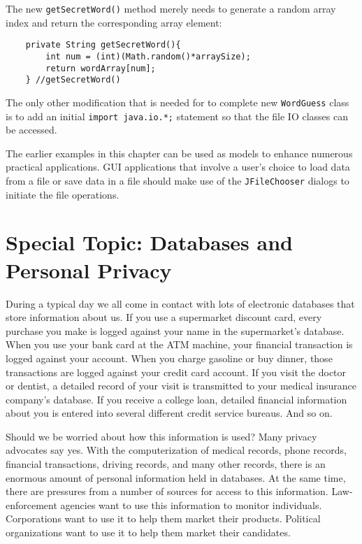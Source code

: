 The new {\tt getSecretWord()} method merely needs to generate a
random array index and return the corresponding array element:
\begin{jjjlisting}
\begin{lstlisting}
    private String getSecretWord(){
        int num = (int)(Math.random()*arraySize);
        return wordArray[num];
    } //getSecretWord()
\end{lstlisting}
\end{jjjlisting}

\noindent The only other modification that is needed for to complete new
{\tt WordGuess} class is to add an initial {\tt import java.io.*;} statement
so that the file IO classes can be accessed. 

The earlier examples in this chapter can be used as models
to enhance numerous practical applications.  GUI applications that involve
a user's choice to load data from a file or save data in a file should make 
use of the {\tt JFileChooser} dialogs to initiate the file operations. 

\section*{Special Topic: Databases and Personal Privacy}

\noindent During a typical day we all come in contact with lots of electronic
databases that store information about us.  If you use a supermarket
discount card, every purchase you make is logged against your name in
the supermarket's database.  When you use your bank card at the ATM
machine, your financial transaction is logged against your account.
When you charge gasoline or buy dinner, those transactions are logged
against your credit card account.  If you visit the doctor or dentist,
a detailed record of your visit is transmitted to your medical
insurance company's database.   If you receive a college loan, detailed
financial information about you is entered into several different
credit service bureaus.   And so on. 

Should we be worried about how this information is used? Many privacy
advocates say yes.  With the computerization of medical records, phone
records, financial transactions, driving records, and many other
records, there is an enormous amount of personal information held in
databases.  At the same time, there are pressures from a number of
sources for access to this information.  Law-enforcement agencies want
to use this information to monitor individuals.   Corporations want to
use it to help them market their products.   Political organizations
want to use it to help them market their candidates.


